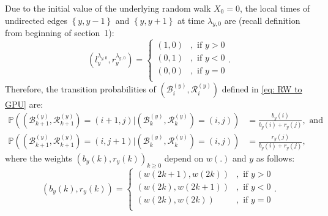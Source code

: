\documentclass[EJP]{ejpecp} %
\begin{document}
Due to the initial value of the underlying random walk $X_0=0$, the local times of undirected edges $\left\{y,y-1\right\}$ and $\left\{y,y+1\right\}$ at time $\lambda_{y,0}$ are 
(recall definition from beginning of section~1):
\begin{equation}\label{eq: initial condition}
	\left(l_y^{\lambda_{y,0}},  r_y^{\lambda_{y,0}}\right) =  \begin{cases}	
		(1, 0) &,  \text{ if }  y>0 \\
		(0, 1) &,  \text{ if }  y<0 \\  
		(0, 0) &,  \text{ if }  y=0 \\
	\end{cases} 
	.\end{equation}	
Therefore, the transition probabilities of $\left(\mathscr{B}_{i}^{(y)},\mathscr{R}_{i}^{(y)} \right)$ defined in \eqref{eq: RW to GPU} are:
\begin{align*}\label{eq: transition prob for GPU}
	\mathbb{P} \left(\left(\mathscr{B}^{(y)}_{k+1},\mathscr{R}^{(y)}_{k+1} \right)=  (i+1,j) \vert \left(\mathscr{B}^{(y)}_{k},\mathscr{R}^{(y)}_{k}\right) =(i,j)  \right) &= \frac{b_y(i)}{b_y(i)+r_y(j)}, \mbox{ and}  \\
	\mathbb{P} \left( \left(\mathscr{B}^{(y)}_{k+1},\mathscr{R}^{(y)}_{k+1}\right)=  (i,j+1) \vert \left(\mathscr{B}^{(y)}_{k},\mathscr{R}^{(y)}_{k}\right) =(i,j)  \right) &= \frac{r_y(j)}{b_y(i)+r_y(j)},
\end{align*} 
where the weights $(b_y(k),r_y(k))_{k\geq 0}$ depend on $w(.)$ and $y$ as follows:
\begin{equation}\label{eq: generalized weights}
	(b_y(k), r_y(k)) = \begin{cases}
		(w(2k+1), w(2k)) &,  \text{ if }  y>0 \\
		(w(2k), w(2k+1)) &,  \text{ if }  y<0 \\  
		(w(2k), w(2k)) &,  \text{ if }  y=0 \\ 
	\end{cases}.
\end{equation}
\end{document}
